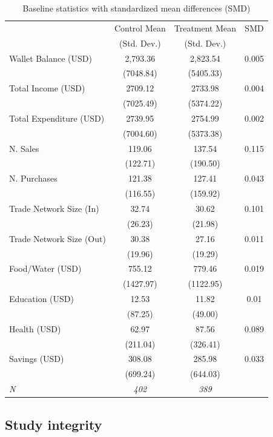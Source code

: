 \documentclass[12pt]{article}
\begin{document}
\begin{table}[h]
    \centering
    \caption{Baseline statistics with standardized mean differences (SMD)}
    \label{tab:tab3}
    \begin{tabular}{lccc} \hline
    & Control Mean & Treatment Mean & SMD \\
    & (Std. Dev.) & (Std. Dev.) & \\ \hline 
    Wallet Balance (USD) & 2,793.36 & 2,823.54 & 0.005 \\
    & (7048.84) & (5405.33) & \\
    Total Income (USD) & 2709.12 & 2733.98 & 0.004 \\
    & (7025.49) & (5374.22) & \\
    Total Expenditure (USD) & 2739.95 & 2754.99 & 0.002 \\
    & (7004.60) & (5373.38) & \\
    N. Sales & 119.06 & 137.54 & 0.115 \\
    & (122.71) & (190.50) & \\
    N. Purchases & 121.38 & 127.41 & 0.043 \\
    & (116.55) & (159.92) & \\
    Trade Network Size (In) & 32.74 & 30.62 & 0.101 \\
    & (26.23) & (21.98) & \\
    Trade Network Size (Out) & 30.38 & 27.16 & 0.011 \\
    & (19.96) & (19.29) & \\
    Food/Water (USD) & 755.12 & 779.46 & 0.019 \\
    & (1427.97) & (1122.95) & \\
    Education (USD) & 12.53 & 11.82 & 0.01 \\
    & (87.25) & (49.00) & \\
    Health (USD) & 62.97 & 87.56 & 0.089 \\
    & (211.04) & (326.41) & \\
    Savings (USD) & 308.08 & 285.98 & 0.033 \\
    & (699.24) & (644.03) & \\ \hline
    \textit{N} & \textit{402} & \textit{389} & \\ \hline
    \end{tabular}
\end{table}

\subsection{Study integrity}
\end{document}
